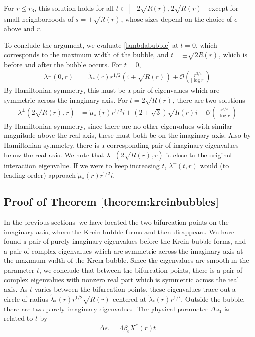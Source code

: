 \documentclass[thesis.tex]{subfiles}
\begin{document}
For $r \leq r_3$, this solution holds for all $t \in [-2\sqrt{R(r)}, 2\sqrt{R(r)}]$ except for small neighborhoods of $s = \pm \sqrt{R(r)}$, whose sizes depend on the choice of $\epsilon$ above and $r$.

To conclude the argument, we evaluate \cref{lambdabubble} at $t = 0$, which corresponds to the maximum width of the bubble, and $t = \pm \sqrt{2 R(r)}$, which is before and after the bubble occurs. For $t = 0$, 
\begin{align*}
\lambda^\pm(0, r) &= \tilde{\lambda}_*(r) r^{1/2}\left(  i \pm \sqrt{ R(r)} \right)  + \mathcal{O}\left( \frac{r^{3/4}}{|\log r|} \right)
\end{align*}
By Hamiltonian symmetry, this must be a pair of eigenvalues which are symmetric across the imaginary axis. For $t = 2 \sqrt{R(r)}$, there are two solutions
\begin{align*}
\lambda^\pm(2 \sqrt{R(r)}, r) &= \tilde{\mu}_*(r) r^{1/2}i + (2 \pm \sqrt{3}) \sqrt{ R(r)}i + \mathcal{O}\left(\frac{r^{3/4}}{|\log r|} \right)
\end{align*}
By Hamiltonian symmetry, since there are no other eigenvalues with similar magnitude above the real axis, these must both be on the imaginary axis. Also by Hamiltonian symmetry, there is a corresponding pair of imaginary eigenvalues below the real axis. We note that $\lambda^-(2\sqrt{R(r)}, r)$ is close to the original interaction eigenvalue. If we were to keep increasing $t$, $\lambda^-(t, r)$ would (to leading order) approach $\tilde{\mu}_*(r) r^{1/2}i$.

\subsection{Proof of Theorem \ref{theorem:kreinbubbles}}

In the previous sections, we have located the two bifurcation points on the imaginary axis, where the Krein bubble forms and then disappears. We have found a pair of purely imaginary eigenvalues before the Krein bubble forms, and a pair of complex eigenvalues which are symmetric across the imaginary axis at the maximum width of the Krein bubble. Since the eigenvalues are smooth in the parameter $t$, we conclude that between the bifurcation points, there is a pair of complex eigenvalues with nonzero real part which is symmetric across the real axis. As $t$ varies between the bifurcation points, these eigenvalues trace out a circle of radius $\tilde{\lambda}_*(r) r^{1/2} \sqrt{ R(r)}$ centered at $\tilde{\lambda}_*(r) r^{1/2}$. Outside the bubble, there are two purely imaginary eigenvalues. The physical parameter $\Delta s_1$ is related to $t$ by
\[
\Delta s_1 = 4 \beta_0 X^*(r) t
\]

\iffulldocument\else
	
	
\fi
\end{document}
